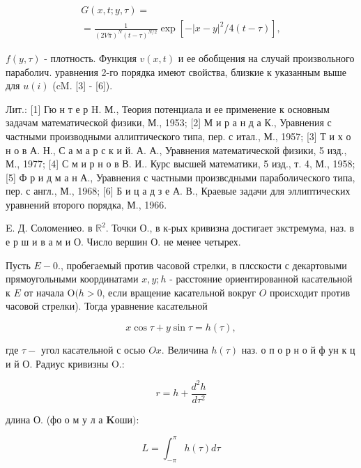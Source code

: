 \documentclass[10pt]{article}
\begin{document}
\[

\begin{gathered}

G(x, t ; y, \tau)= \\

=\frac{1}{(2 V \bar{\pi})^{N}(t-\tau)^{N / 2}} \exp \left[-|x-y|^{2} / 4(t-\tau)\right],

\end{gathered}

\]



$f(y, \tau)$ - плотность. Функция $v(x, t)$ и ее обобщения на случай произвольного параболич. уравнения 2-го порядка имеют свойства, близкие к указанным выше для $u(i)$ (cM. [3] - [6]).



Лит.: [1] Гю н т е р H. М., Теория потенциала и ее применение к основным задачам математической физики, М., 1953; [2] М и р а н д а К., Уравнения с частными производными әллиптического типа, пер. с итал., М., 1957; [3] Т и х о н о в А. Н., С а м а р с к и й. А. А., Уравнения математической физики, 5 изд., М., 1977; [4] С м и р н о в В. И.. Курс высшей математики, 5 изд., т. 4, М., 1958; [5] Ф р и д м а н А., Уравнения с частными произвсдными параболического типа, пер. с англ., М., 1968; [6] Б и ц а д з е А. В., Краевые задачи для эллиптических уравнений второго порядка, М., 1966.



E. Д. Соломениео. в $\mathbb{R}^{2}$. Точки О., в к-рых кривизна достигает экстремума, наз. в е р ш и в а м и О. Число вершин О. не менее четырех.



Пусть $E-0 .$, пробегаемый против часовой стрелки, в плсскости с декартовыми прямоугольными координатами $x, y ; h$ - расстояние ориентированной касательной к $E$ от начала $\mathrm{O}(h>0$, если вращение касательной вокруг $O$ происходит против часовой стрелки). Тогда уравнение касательной



\[

x \cos \tau+y \sin \tau=h(\tau),

\]



где $\tau-$ угол касательной с осью $O x$. Величина $h(\tau)$ наз. о п о р н о й ф ун к ц и й $\mathrm{О}$. Радиус кривизны O.:



\[

r=h+\frac{d^{2} h}{d \tau^{2}}

\]



длина О. (фо о м у л а $\mathbf{K} о ш и):$



\[

L=\int_{-\pi}^{\pi} h(\tau) d \tau

\]
\end{document}
